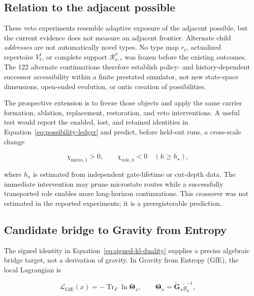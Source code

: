 \subsection{Relation to the adjacent possible}

These veto experiments resemble adaptive exposure of the adjacent possible,
but the current evidence does not measure an adjacent frontier. Alternate child
\emph{addresses} are not automatically novel types. No type map $r_\ell$,
actualized repertoire $V_t^\ell$, or complete support
$\mathcal R_{x,\tau}^{\pi}$ was frozen before the existing outcomes. The 122
alternate continuations therefore establish policy- and history-dependent
successor accessibility within a finite prestated simulator, not new
state-space dimensions, open-ended evolution, or ontic creation of
possibilities.

The prospective extension is to freeze those objects and apply the same carrier
formation, ablation, replacement, restoration, and veto interventions. A useful
test would report the enabled, lost, and retained identities in
Equation~\ref{eq:possibility-ledger} and predict, before held-out runs, a
cross-scale change

\begin{equation}
\chi_{\mathrm{micro},1}>0,
\qquad
\chi_{\mathrm{role},h}<0\quad(h\ge h_\star),
\label{eq:prospective-crossover}
\end{equation}

where $h_\star$ is estimated from independent gate-lifetime or cut-depth data.
The immediate intervention may prune microstate routes while a successfully
transported role enables more long-horizon continuations. This crossover was
not estimated in the reported experiments; it is a preregisterable prediction.

\subsection{Candidate bridge to Gravity from Entropy}
\label{sec:gfe-bridge}

The signed identity in Equation~\ref{eq:signed-kl-duality} supplies a precise
algebraic bridge target, not a derivation of gravity. In Gravity from Entropy
(GfE), the local Lagrangian is

\begin{equation}
\mathcal{L}_{\mathrm{GfE}}(x)
=-\operatorname{Tr}_{F}\ln\boldsymbol{\Theta}_x,
\qquad
\boldsymbol{\Theta}_x
=\widetilde{\mathbf{G}}_x\widetilde{g}_x^{-1},
\label{eq:gfe-lagrangian}
\end{equation}

